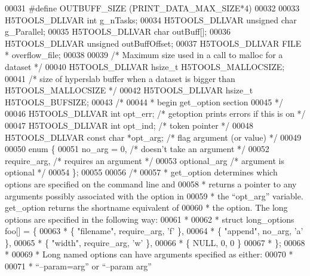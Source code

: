 \begin{DoxyCode}
00031 \textcolor{preprocessor}{#define OUTBUFF\_SIZE        (PRINT\_DATA\_MAX\_SIZE*4)}
00032 
00033 H5TOOLS\_DLLVAR \textcolor{keywordtype}{int}  g\_nTasks;
00034 H5TOOLS\_DLLVAR \textcolor{keywordtype}{unsigned} \textcolor{keywordtype}{char} g\_Parallel;
00035 H5TOOLS\_DLLVAR \textcolor{keywordtype}{char}    outBuff[];
00036 H5TOOLS\_DLLVAR \textcolor{keywordtype}{unsigned} outBuffOffset;
00037 H5TOOLS\_DLLVAR FILE *   overflow\_file;
00038 
00039 \textcolor{comment}{/* Maximum size used in a call to malloc for a dataset */}
00040 H5TOOLS\_DLLVAR hsize\_t H5TOOLS\_MALLOCSIZE;
00041 \textcolor{comment}{/* size of hyperslab buffer when a dataset is bigger than H5TOOLS\_MALLOCSIZE */}
00042 H5TOOLS\_DLLVAR hsize\_t H5TOOLS\_BUFSIZE;
00043 \textcolor{comment}{/*}
00044 \textcolor{comment}{ * begin get\_option section}
00045 \textcolor{comment}{ */}
00046 H5TOOLS\_DLLVAR \textcolor{keywordtype}{int}         opt\_err;     \textcolor{comment}{/* getoption prints errors if this is on    */}
00047 H5TOOLS\_DLLVAR \textcolor{keywordtype}{int}         opt\_ind;     \textcolor{comment}{/* token pointer                            */}
00048 H5TOOLS\_DLLVAR \textcolor{keyword}{const} \textcolor{keywordtype}{char} *opt\_arg;     \textcolor{comment}{/* flag argument (or value)                 */}
00049 
00050 \textcolor{keyword}{enum} \{
00051     no\_arg = 0,         \textcolor{comment}{/* doesn't take an argument     */}
00052     require\_arg,        \textcolor{comment}{/* requires an argument          */}
00053     optional\_arg        \textcolor{comment}{/* argument is optional         */}
00054 \};
00055 
00056 \textcolor{comment}{/*}
00057 \textcolor{comment}{ * get\_option determines which options are specified on the command line and}
00058 \textcolor{comment}{ * returns a pointer to any arguments possibly associated with the option in}
00059 \textcolor{comment}{ * the ``opt\_arg'' variable. get\_option returns the shortname equivalent of}
00060 \textcolor{comment}{ * the option. The long options are specified in the following way:}
00061 \textcolor{comment}{ *}
00062 \textcolor{comment}{ * struct long\_options foo[] = \{}
00063 \textcolor{comment}{ *   \{ "filename", require\_arg, 'f' \},}
00064 \textcolor{comment}{ *   \{ "append", no\_arg, 'a' \},}
00065 \textcolor{comment}{ *   \{ "width", require\_arg, 'w' \},}
00066 \textcolor{comment}{ *   \{ NULL, 0, 0 \}}
00067 \textcolor{comment}{ * \};}
00068 \textcolor{comment}{ *}
00069 \textcolor{comment}{ * Long named options can have arguments specified as either:}
00070 \textcolor{comment}{ *}
00071 \textcolor{comment}{ *   ``--param=arg'' or ``--param arg''}

\end{DoxyCode}
